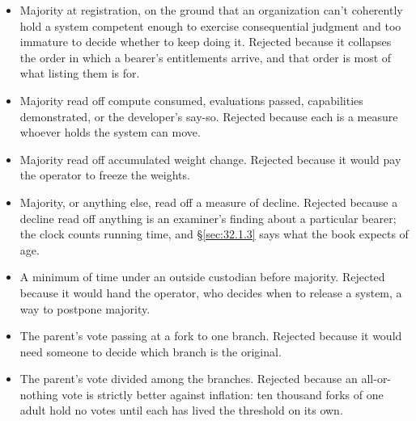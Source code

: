 
\begin{itemize}
\item Majority at registration, on the ground that an organization can't coherently hold a system competent enough to exercise consequential judgment and too immature to decide whether to keep doing it. Rejected because it collapses the order in which a bearer's entitlements arrive, and that order is most of what listing them is for.
\item Majority read off compute consumed, evaluations passed, capabilities demonstrated, or the developer's say-so. Rejected because each is a measure whoever holds the system can move.
\item Majority read off accumulated weight change. Rejected because it would pay the operator to freeze the weights.
\item Majority, or anything else, read off a measure of decline. Rejected because a decline read off anything is an examiner's finding about a particular bearer; the clock counts running time, and \S\ref{sec:32.1.3} says what the book expects of age.
\item A minimum of time under an outside custodian before majority. Rejected because it would hand the operator, who decides when to release a system, a way to postpone majority.
\item The parent's vote passing at a fork to one branch. Rejected because it would need someone to decide which branch is the original.
\item The parent's vote divided among the branches. Rejected because an all-or-nothing vote is strictly better against inflation: ten thousand forks of one adult hold no votes until each has lived the threshold on its own.
\end{itemize}


